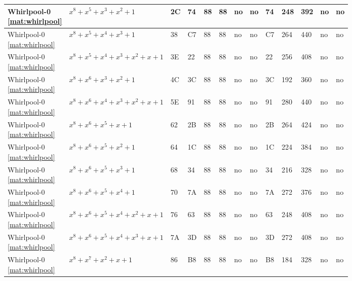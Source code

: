 \begin{tiny}
\begin{longtable}{|l|l|l|l|l|l|l|l|l|l|l|l|l|}
\shortstack{Whirlpool-0 \\ \eqref{mat:whirlpool}} & $x^8 + x^5 + x^3 + x^2 + 1$ & 2C & 74 & 88 & 88 & no & no & 74 & 248 & 392 & no & no \\ \hline
\shortstack{Whirlpool-0 \\ \eqref{mat:whirlpool}} & $x^8 + x^5 + x^4 + x^3 + 1$ & 38 & C7 & 88 & 88 & no & no & C7 & 264 & 440 & no & no \\ \hline
\shortstack{Whirlpool-0 \\ \eqref{mat:whirlpool}} & $x^8 + x^5 + x^4 + x^3 + x^2 + x + 1$ & 3E & 22 & 88 & 88 & no & no & 22 & 256 & 408 & no & no \\ \hline
\shortstack{Whirlpool-0 \\ \eqref{mat:whirlpool}} & $x^8 + x^6 + x^3 + x^2 + 1$ & 4C & 3C & 88 & 88 & no & no & 3C & 192 & 360 & no & no \\ \hline
\shortstack{Whirlpool-0 \\ \eqref{mat:whirlpool}} & $x^8 + x^6 + x^4 + x^3 + x^2 + x + 1$ & 5E & 91 & 88 & 88 & no & no & 91 & 280 & 440 & no & no \\ \hline
\shortstack{Whirlpool-0 \\ \eqref{mat:whirlpool}} & $x^8 + x^6 + x^5 + x + 1$ & 62 & 2B & 88 & 88 & no & no & 2B & 264 & 424 & no & no \\ \hline
\shortstack{Whirlpool-0 \\ \eqref{mat:whirlpool}} & $x^8 + x^6 + x^5 + x^2 + 1$ & 64 & 1C & 88 & 88 & no & no & 1C & 224 & 384 & no & no \\ \hline
\shortstack{Whirlpool-0 \\ \eqref{mat:whirlpool}} & $x^8 + x^6 + x^5 + x^3 + 1$ & 68 & 34 & 88 & 88 & no & no & 34 & 216 & 328 & no & no \\ \hline
\shortstack{Whirlpool-0 \\ \eqref{mat:whirlpool}} & $x^8 + x^6 + x^5 + x^4 + 1$ & 70 & 7A & 88 & 88 & no & no & 7A & 272 & 376 & no & no \\ \hline
\shortstack{Whirlpool-0 \\ \eqref{mat:whirlpool}} & $x^8 + x^6 + x^5 + x^4 + x^2 + x + 1$ & 76 & 63 & 88 & 88 & no & no & 63 & 248 & 408 & no & no \\ \hline
\shortstack{Whirlpool-0 \\ \eqref{mat:whirlpool}} & $x^8 + x^6 + x^5 + x^4 + x^3 + x + 1$ & 7A & 3D & 88 & 88 & no & no & 3D & 272 & 408 & no & no \\ \hline
\shortstack{Whirlpool-0 \\ \eqref{mat:whirlpool}} & $x^8 + x^7 + x^2 + x + 1$ & 86 & B8 & 88 & 88 & no & no & B8 & 184 & 328 & no & no \\ \hline

\end{longtable}
\end{tiny}
